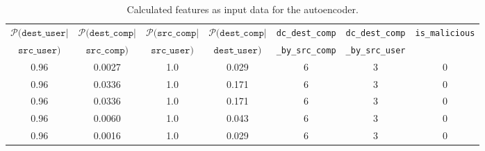 \documentclass[sigconf]{acmart}
\begin{document}
\begin{table}[t]
  \small	
  \centering
  \begin{tabular}{|c|c|c|c|c|c|c|}
  \hline
  $\mathcal P(\texttt{dest\_user|}$\hfill & $\mathcal P(\texttt{dest\_comp|}$\hfill & $\mathcal P(\texttt{src\_comp|}$\hfill & $\mathcal P(\texttt{dest\_comp|}$\hfill & \texttt{dc\_dest\_comp}\hfill  & \texttt{dc\_dest\_comp}\hfill & \texttt{is\_malicious} \\
              \hfill$\texttt{src\_user})$ &             \hfill$\texttt{src\_comp})$ &                \hfill$\texttt{src\_user})$ &                \hfill$\texttt{dest\_user})$ & \hfill\texttt{\_by\_src\_comp} &    \hfill\texttt{\_by\_src\_user} & \                      \\
  \hline
  0.96                                    & 0.0027                                      & 1.0                                        & 0.029                                       & 6                                  & 3                                 & 0                      \\
  \hline
  0.96                                    & 0.0336                                      & 1.0                                        & 0.171                                       & 6                                  & 3                                 & 0                      \\
  \hline
  0.96                                    & 0.0336                                      & 1.0                                        & 0.171                                       & 6                                  & 3                                 & 0                      \\
  \hline
  0.96                                    & 0.0060                                      & 1.0                                        & 0.043                                       & 6                                  & 3                                 & 0                      \\
  \hline
  0.96                                    & 0.0016                                      & 1.0                                        & 0.029                                       & 6                                  & 3                                 & 0                      \\
  \hline
  \end{tabular}
  \caption{Calculated features as input data for the autoencoder.}
  \label{tab:2}
\end{table}
\end{document}
